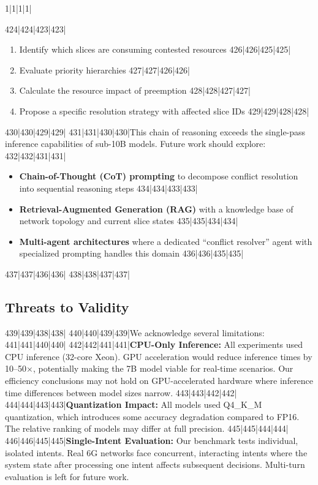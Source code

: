 1|1|1|1|\documentclass[10pt,conference]{IEEEtran}
\begin{document}
424|424|423|423|\begin{enumerate}
425|425|424|424|    \item Identify which slices are consuming contested resources
426|426|425|425|    \item Evaluate priority hierarchies
427|427|426|426|    \item Calculate the resource impact of preemption
428|428|427|427|    \item Propose a specific resolution strategy with affected slice IDs
429|429|428|428|\end{enumerate}
430|430|429|429|
431|431|430|430|This chain of reasoning exceeds the single-pass inference capabilities of sub-10B models. Future work should explore:
432|432|431|431|\begin{itemize}
433|433|432|432|    \item \textbf{Chain-of-Thought (CoT) prompting} to decompose conflict resolution into sequential reasoning steps
434|434|433|433|    \item \textbf{Retrieval-Augmented Generation (RAG)} with a knowledge base of network topology and current slice states
435|435|434|434|    \item \textbf{Multi-agent architectures} where a dedicated ``conflict resolver'' agent with specialized prompting handles this domain
436|436|435|435|\end{itemize}
437|437|436|436|
438|438|437|437|\subsection{Threats to Validity}
439|439|438|438|
440|440|439|439|We acknowledge several limitations:
441|441|440|440|
442|442|441|441|\textbf{CPU-Only Inference:} All experiments used CPU inference (32-core Xeon). GPU acceleration would reduce inference times by 10--50$\times$, potentially making the 7B model viable for real-time scenarios. Our efficiency conclusions may not hold on GPU-accelerated hardware where inference time differences between model sizes narrow.
443|443|442|442|
444|444|443|443|\textbf{Quantization Impact:} All models used Q4\_K\_M quantization, which introduces some accuracy degradation compared to FP16. The relative ranking of models may differ at full precision.
445|445|444|444|
446|446|445|445|\textbf{Single-Intent Evaluation:} Our benchmark tests individual, isolated intents. Real 6G networks face concurrent, interacting intents where the system state after processing one intent affects subsequent decisions. Multi-turn evaluation is left for future work.
\end{document}
